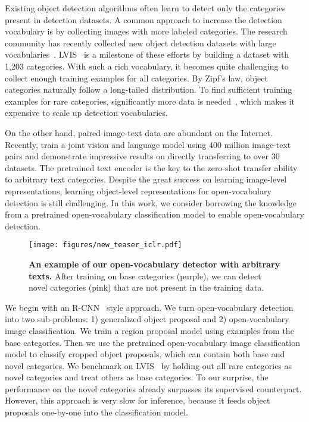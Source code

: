 \documentclass{article} \usepackage{iclr2022_conference,times}
\begin{document}
Existing object detection algorithms often learn to detect only the categories present in detection datasets. A common approach to increase the detection vocabulary is by collecting images with more labeled categories.
The research community has recently collected new object detection datasets with large vocabularies~\citep{lvis,OpenImages}.
LVIS~\citep{lvis} is a milestone of these efforts by building a dataset with 1,203 categories.
With such a rich vocabulary, it becomes quite challenging to collect enough training examples for all categories.
By Zipf's law, object categories naturally follow a long-tailed distribution. To find sufficient training examples for rare categories, significantly more data is needed~\citep{lvis}, which makes it expensive to scale up detection vocabularies.

On the other hand, paired image-text data are abundant on the Internet.
Recently, \citet{radford2021clip} train a joint vision and language model using 400 million image-text pairs and demonstrate impressive results on directly transferring to over 30 datasets.
The pretrained text encoder is the key to the zero-shot transfer ability to arbitrary text categories.
Despite the great success on learning image-level representations, learning object-level representations for open-vocabulary detection is still challenging.
In this work, we consider borrowing the knowledge from a pretrained open-vocabulary classification model to enable open-vocabulary detection.


\begin{figure}[t]
    \centering
    \texttt{[image: figures/new\_teaser\_iclr.pdf]}
    \vspace{-1.5ex}
    \caption{\textbf{An example of our open-vocabulary detector with arbitrary texts.} After training on base categories (purple), we can detect novel categories (pink) that are not present in the training data.
    }
\label{fig:teaser}
\vspace{-3ex}
\end{figure}


We begin with an R-CNN~\citep{girshick2014rcnn} style approach.
We turn open-vocabulary detection into two sub-problems: 1) generalized object proposal and 2) open-vocabulary image classification.
We train a region proposal model using examples from the base categories. Then we use the pretrained open-vocabulary image classification model to classify cropped object proposals, which can contain both base and novel categories.
We benchmark on LVIS~\citep{lvis} by holding out all rare categories as novel categories and treat others as base categories.
To our surprise, the performance on the novel categories already surpasses its supervised counterpart.
However, this approach is very slow for inference, because it feeds object proposals one-by-one into the classification model.
\end{document}
